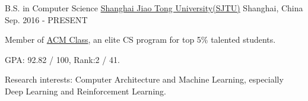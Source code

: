 \begin{cventries}
	\cventry
	{B.S. in Computer Science}
	{\href{http://en.sjtu.edu.cn/}{Shanghai Jiao Tong University(SJTU)}}
	{Shanghai, China}
	{Sep. 2016 - PRESENT}
	{
		\begin{cvitems}
			\item {Member of \href{https://acm.sjtu.edu.cn}{ACM Class}, an elite CS program for top 5\% talented students.}
            \item {GPA: 92.82 / 100, Rank:2 / 41.}
            \item {Research interests: Computer Architecture and Machine Learning, especially Deep Learning and Reinforcement Learning.}
		\end{cvitems}
	}
\end{cventries}
